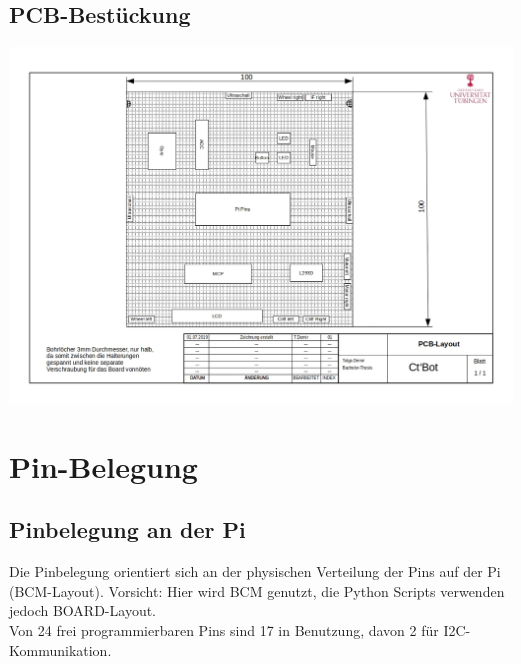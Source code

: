 \documentclass[a4paper,cleardoubleempty,BCOR1cm]{book}
\begin{document}
\subsection{PCB-Bestückung}
\includegraphics[angle=90,origin=c, scale= 0.7]{images/PCB-Layout.jpg}

\section{Pin-Belegung}
\subsection{Pinbelegung an der Pi}
Die Pinbelegung orientiert sich an der physischen Verteilung der Pins auf der Pi (BCM-Layout). Vorsicht: Hier wird BCM genutzt, die Python Scripts verwenden jedoch BOARD-Layout. \\
Von 24 frei programmierbaren Pins sind 17 in Benutzung, davon 2 für I2C-Kommunikation. 
\end{document}
